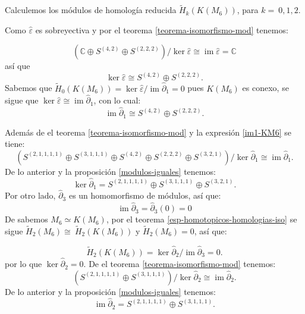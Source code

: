 \documentclass[12pt]{book}
\theoremstyle{definition}
\DeclareMathOperator{\im}{im}
\newcounter{in}
\begin{document}

Calculemos los módulos de homología reducida $\widetilde
H_{k}(K(M_{6}))$, para $k=~0,1,2$.

Como $\widehat\varepsilon$ es sobreyectiva y por el teorema
\ref{teorema-isomorfismo-mod} tenemos:

\begin{equation*}
  (\mathbb{C} \oplus S^{(4,2)}\oplus S^{(2,2,2)})/\ker\widehat\varepsilon\cong \im \widehat\varepsilon=\mathbb{C}
\end{equation*}
así que
\begin{equation*}
  \label{ker0-KM6}
  \ker\widehat\varepsilon\cong S^{(4,2)}\oplus S^{(2,2,2)}.
\end{equation*}
Sabemos que $\widetilde H_{0}(K(M_{6}))=\ker \widehat\varepsilon/\im
\widehat\partial_{1}=0$ pues $K(M_{6})$ es conexo, se sigue que $\ker \widehat\varepsilon\cong
\im\widehat\partial_{1}$, con lo cual:
\begin{equation}
  \label{im1-KM6}
  \im \widehat\partial_{1}\cong S^{(4,2)}\oplus S^{(2,2,2)}.
\end{equation}

Además de el teorema \ref{teorema-isomorfismo-mod} y la expresión \ref{im1-KM6} se tiene:
$$(S^{(2,1,1,1,1)}\oplus S^{(3,1,1,1)}\oplus S^{(4,2)}\oplus
      S^{(2,2,2)}\oplus S^{(3,2,1)})/\ker \widehat\partial_{1}\cong \im \widehat\partial_{1}.$$
De lo anterior y la proposición \ref{modulos-iguales} tenemos:
\begin{equation}
  \label{ker1-KM6}
  \ker \widehat\partial_{1}=S^{(2,1,1,1,1)}\oplus S^{(3,1,1,1)}\oplus S^{(3,2,1)}.
\end{equation}
Por otro lado, $\widehat\partial_{3}$ es un homomorfismo de módulos, así que:
\begin{equation*}
\im\widehat\partial_{3}=\widehat\partial_{3}(0)=0
\label{im3-KM6}
\end{equation*}
De \cite{larrion2009clique} sabemos $M_{6}\simeq K(M_{6})$,
por el teorema \ref{esp-homotopicos-homologias-iso} se sigue $\widetilde H_{2}(M_{6})\cong~\widetilde H_{2}(K(M_{6}))$ y  $\widetilde
H_{2}(M_{6})=0$, así que:

\begin{equation*}
\widetilde H_{2}(K(M_{6}))=\ker \widehat\partial_{2}/\im \widehat\partial_{3}=0.
\end{equation*}
por lo que $\ker \widehat\partial_{2}=0$. De el teorema
\ref{teorema-isomorfismo-mod} tenemos:
$$(S^{(2,1,1,1,1)}\oplus S^{(3,1,1,1)})/\ker \widehat\partial_{2}\cong \im
\widehat\partial_{2}.$$
De lo anterior y la proposición \ref{modulos-iguales} tenemos:
\begin{equation}
  \im \widehat\partial_{2}=S^{(2,1,1,1,1)}\oplus S^{(3,1,1,1)}.
  \label{im2-KM6}
\end{equation}
\end{document}
